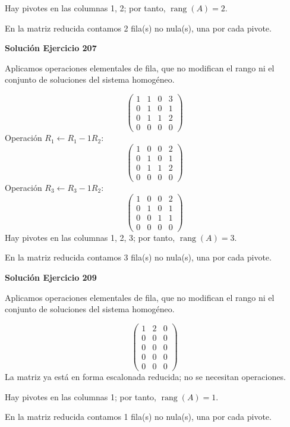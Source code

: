 \documentclass[12pt]{article}
\newcommand{\rang}{\operatorname{rang}}
\begin{document}
Hay pivotes en las columnas 1, 2; por tanto, $\boxed{\rang(A)=2}$.

En la matriz reducida contamos 2 fila(s) no nula(s), una por cada pivote.


\par\bigskip\noindent\textbf{Solución Ejercicio 207}\par\nobreak
Aplicamos operaciones elementales de fila, que no modifican el rango ni el conjunto de soluciones del sistema homogéneo.

\[
\begin{pmatrix}1&1&0&3\\0&1&0&1\\0&1&1&2\\0&0&0&0\end{pmatrix}
\]
Operación $R_{1}\leftarrow R_{1}-1R_{2}$:
\[
\begin{pmatrix}1&0&0&2\\0&1&0&1\\0&1&1&2\\0&0&0&0\end{pmatrix}
\]
Operación $R_{3}\leftarrow R_{3}-1R_{2}$:
\[
\begin{pmatrix}1&0&0&2\\0&1&0&1\\0&0&1&1\\0&0&0&0\end{pmatrix}
\]
Hay pivotes en las columnas 1, 2, 3; por tanto, $\boxed{\rang(A)=3}$.

En la matriz reducida contamos 3 fila(s) no nula(s), una por cada pivote.


\par\bigskip\noindent\textbf{Solución Ejercicio 209}\par\nobreak
Aplicamos operaciones elementales de fila, que no modifican el rango ni el conjunto de soluciones del sistema homogéneo.

\[
\begin{pmatrix}1&2&0\\0&0&0\\0&0&0\\0&0&0\\0&0&0\end{pmatrix}
\]
La matriz ya está en forma escalonada reducida; no se necesitan operaciones.

Hay pivotes en las columnas 1; por tanto, $\boxed{\rang(A)=1}$.

En la matriz reducida contamos 1 fila(s) no nula(s), una por cada pivote.
\end{document}
